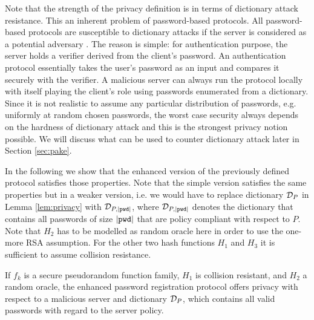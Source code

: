 Note that the strength of the privacy definition is in terms of dictionary attack resistance. 
This an inherent problem of password-based protocols. 
All password-based protocols are susceptible to dictionary attacks if the server is considered as a potential adversary \cite{MenezesOV96}. 
The reason is simple: for authentication purpose, the server holds a verifier derived from the client's password. 
An authentication protocol essentially takes the user's password as an input and compares it securely with the verifier. 
A malicious server can always run the protocol locally with itself playing the client's role using passwords enumerated from a dictionary.  Since it is not realistic to assume any particular distribution of passwords, e.g. uniformly at random chosen passwords, the worst case security always depends on the hardness of dictionary attack and this is the strongest privacy notion possible. We will discuss what can be used to counter dictionary attack later in Section \ref{sec:pake}.

In the following we show that the enhanced version of the previously defined protocol satisfies those properties.
Note that the simple version satisfies the same properties but in a weaker version, i.e. we would have to replace dictionary $\mathcal{D}_P$ in Lemma \ref{lem:privacy} with $\mathcal{D}_{P,|\mathtt{pwd}|}$, where $\mathcal{D}_{P,|\mathtt{pwd}|}$ denotes the dictionary that contains all passwords of size $|\mathtt{pwd}|$ that are policy compliant with respect to $P$.
Note that $H_2$ has to be modelled as random oracle here in order to use the one-more RSA assumption.
For the other two hash functions $H_1$ and $H_3$ it is sufficient to assume collision resistance.

\begin{lemma}[Privacy]\label{lem:privacy}
If $f_k$ is a secure pseudorandom function family, $H_1$ is collision resistant, and $H_2$ a random oracle, the enhanced password registration protocol offers privacy with respect to a malicious server and dictionary $\mathcal{D}_P$, which contains all valid passwords with regard to the server policy.
\end{lemma}


